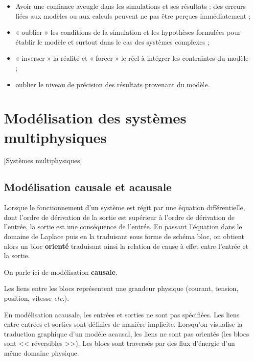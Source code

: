 \begin{itemize}[label=]
\item Avoir une confiance aveugle dans les simulations et ses résultats : des erreurs liées aux
modèles ou aux calculs peuvent ne pas être perçues immédiatement ;
\item « oublier » les conditions de la simulation et les hypothèses formulées pour établir le
modèle et surtout dans le cas des systèmes complexes ;
\item « inverser » la réalité et « forcer » le réel à intégrer les contraintes du modèle ;
\item oublier le niveau de précision des résultats provenant du modèle.
\end{itemize}



\section{Modélisation des systèmes multiphysiques}[Systèmes multiphysiques]
\subsection{Modélisation causale et acausale}

Lorsque le fonctionnement d'un système est régit par une équation différentielle, dont l'ordre de dérivation de la sortie est supérieur à l'ordre de dérivation de l'entrée, la sortie est une conséquence de l'entrée. En passant l'équation dans le domaine de Laplace puis en la traduisant sous forme de schéma bloc, on obtient alors un bloc \textbf{orienté} traduisant ainsi la relation de cause à effet entre l'entrée et la sortie. 

On parle ici de modélisation \textbf{causale}. 

Les liens entre les blocs représentent une grandeur physique (courant, tension, position, vitesse \textit{etc}.).


En modélisation acausale, les entrées et sorties ne sont pas spécifiées. Les liens entre entrées et sorties sont définies de manière implicite. Lorsqu'on visualise la traduction graphique d'un modèle acausal, les liens ne sont pas orientés (les blocs sont << réversibles >>). Les blocs sont traversés par des flux d'énergie d'un même domaine physique.  

